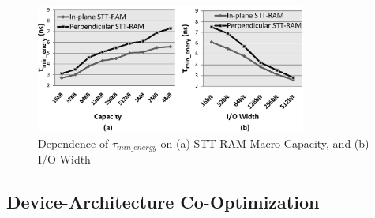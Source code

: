\begin{figure}[t]
  \centering
  \includegraphics[width=3.5in]{fig/MinEnergy.eps}
  \vspace{-10pt}
  \caption{Dependence of $\tau_{min\_energy}$ on (a) STT-RAM Macro Capacity, and (b) I/O Width}
  \label{fig:minenergy}
  \vspace{-15pt}
\end{figure}

\subsection{Device-Architecture Co-Optimization}

